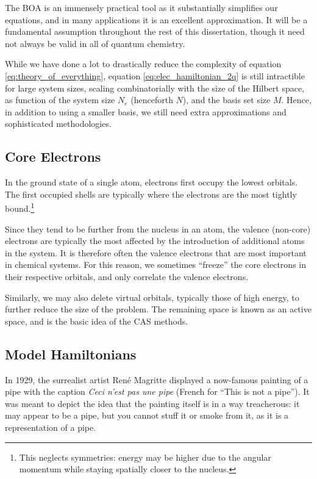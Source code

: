 The \gls{BOA} is an immensely practical tool as it substantially simplifies our equations, and in many applications it is an excellent approximation. It will be a fundamental assumption throughout the rest of this dissertation, though it need not always be valid in all of quantum chemistry.

While we have done a lot to drastically reduce the complexity of equation \eqref{eq:theory_of_everything}, equation \eqref{eq:elec_hamiltonian_2q} is still intractible for large system sizes, scaling combinatorially with the size of the Hilbert space, as function of the system size $N_e$ (henceforth $N$), and the basis set size $M$. Hence, in addition to using a smaller basis, we still need extra approximations and sophisticated methodologies.


\subsection{Core Electrons}
\label{sec:core_electrons}

In the ground state of a single atom, electrons first occupy the lowest orbitals. The first occupied shells are typically where the electrons are the most tightly bound.\footnote{This neglects symmetries: energy may be higher due to the angular momentum while staying spatially closer to the nucleus.}

Since they tend to be further from the nucleus in an atom, the valence (non-core) electrons are typically the most affected by the introduction of additional atoms in the system. It is therefore often the valence electrons that are most important in chemical systems. For this reason, we sometimes ``freeze'' the core electrons in their respective orbitals, and only correlate the valence electrons.

Similarly, we may also delete virtual orbitals, typically those of high energy, to further reduce the size of the problem. The remaining space is known as an active space, and is the basic idea of the \gls{CAS} methods.

\subsection{Model Hamiltonians}

In 1929, the surrealist artist Ren\'e Magritte displayed a now-famous painting of a pipe with the caption \emph{Ceci n'est pas une pipe} (French for ``This is not a pipe''). It was meant to depict the idea that the painting itself is in a way treacherous: it may appear to be a pipe, but you cannot stuff it or smoke from it, as it is a representation of a pipe.

